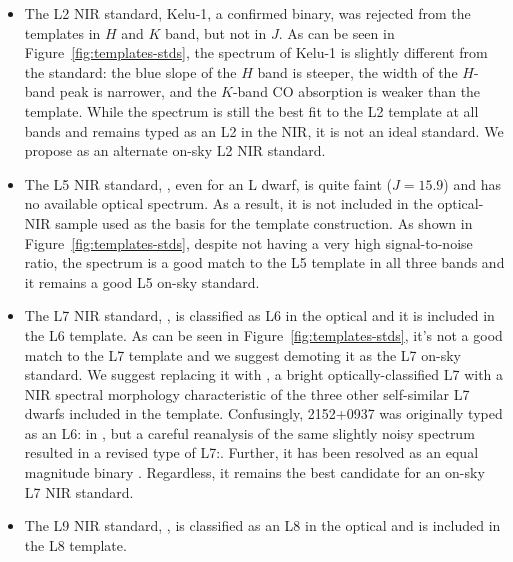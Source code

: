 \documentclass[12pt,preprint]{aastex}
\begin{document}
\begin{itemize}

	\item The L2 NIR standard,  Kelu-1, a confirmed binary, was rejected from the templates in $H$ and $K$ band, but not in $J$. As can be seen in Figure~\ref{fig:templates-stds}, the spectrum of Kelu-1 is slightly different from the standard: the blue slope of the $H$ band is steeper, the width of the $H$-band peak is narrower, and the $K$-band CO absorption is weaker than the template. While the spectrum is still the best fit to the L2 template at all bands and remains typed as an L2 in the NIR, it is not an ideal standard. We propose  as an alternate on-sky L2 NIR standard. 

	\item The L5 NIR standard, , even for an L dwarf, is quite faint ($J=15.9$) and has no available optical spectrum. As a result, it is not included in the optical-NIR sample used as the basis for the template construction. As shown in Figure~\ref{fig:templates-stds}, despite not having a very high signal-to-noise ratio, the spectrum is a good match to the L5 template in all three bands and it remains a good L5 on-sky standard.

	\item The L7 NIR standard, , is classified as L6 in the optical \cite{K00} and it is included in the L6 template. As can be seen in Figure~\ref{fig:templates-stds}, it's not a good match to the L7 template and we suggest demoting it as the L7 on-sky standard. We suggest replacing it with , a bright optically-classified L7 with a NIR spectral morphology characteristic of the three other self-similar L7 dwarfs included in the template. Confusingly, 2152+0937 was originally typed as an L6: in \cite{Reid08}, but a careful reanalysis of the same slightly noisy spectrum resulted in a revised type of L7:. Further, it has been resolved as an equal magnitude binary \cite{Reid06_binary}. Regardless, it remains the best candidate for an on-sky L7 NIR standard.
		
	\item The L9 NIR standard, , is classified as an L8 in the optical and is included in the L8 template. 
	
\end{itemize}

\end{document}

